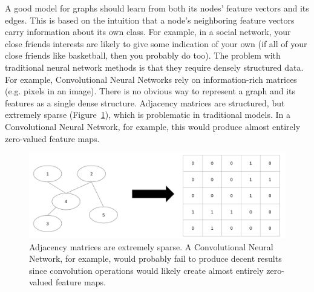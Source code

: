 A good model for graphs should learn from both its nodes' feature vectors and its edges. This is based on the intuition that a node's neighboring feature vectors carry information about its own class. For example, in a social network, your close friends interests are likely to give some indication of your own (if all of your close friends like basketball, then you probably do too). The problem with traditional neural network methods is that they require densely structured data. For example, Convolutional Neural Networks rely on information-rich matrices (e.g. pixels in an image). There is no obvious way to represent a graph and its features as a single dense structure. Adjacency matrices are structured, but extremely sparse (Figure~\ref{fig:sparse}), which is problematic in traditional models. In a Convolutional Neural Network, for example, this would produce almost entirely zero-valued feature maps. 

\begin{figure}[h!]
	\centering
	\includegraphics[width=1\linewidth]{media/sparse.png} 
	\caption{Adjacency matrices are extremely sparse. A Convolutional Neural Network, for example, would probably fail to produce decent results since convolution operations would likely create almost entirely zero-valued feature maps.}
	\label{fig:sparse}
\end{figure}
